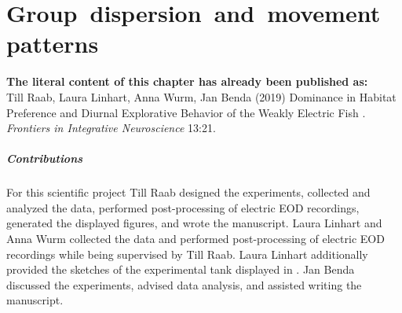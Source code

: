 \chapter{\mbox{Group dispersion and movement patterns}}
\label{Habitats}

\textbf{The literal content of this chapter has already been published as:}\\  
Till Raab, Laura Linhart, Anna Wurm, Jan Benda (2019) Dominance in Habitat Preference and Diurnal Explorative Behavior of the Weakly Electric Fish \Lepto{}. \textit{Frontiers in Integrative Neuroscience} 13:21.

\paragraph*{Contributions}
For this scientific project Till Raab designed the experiments, collected and analyzed the data, performed post-processing of electric EOD recordings, generated the displayed figures, and wrote the manuscript. 
Laura Linhart and Anna Wurm collected the data and performed post-processing of electric EOD recordings while being supervised by Till Raab. Laura Linhart additionally provided the sketches of the experimental tank displayed in . 
Jan Benda discussed the experiments, advised data analysis, and assisted writing the manuscript. 

